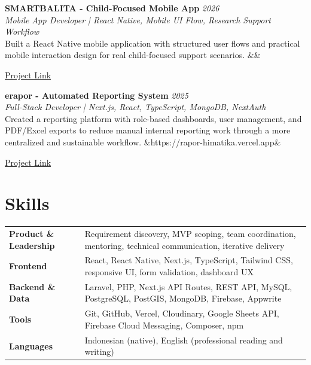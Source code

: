 \documentclass[a4paper,10pt]{article}
\newcommand{\project}[5]{%
  \textbf{#1} \hfill \textit{#2}\\
  \textit{\small #3}\\
  {\small #4}
  \ifx&#5& \else \par{\small \href{#5}{Project Link}} \fi
  \vspace{4pt}
}
\begin{document}
\project
  {SMARTBALITA - Child-Focused Mobile App}
  {2026}
  {Mobile App Developer | React Native, Mobile UI Flow, Research Support Workflow}
  {Built a React Native mobile application with structured user flows and practical mobile interaction design for real child-focused support scenarios.}
  {}

\project
  {erapor - Automated Reporting System}
  {2025}
  {Full-Stack Developer | Next.js, React, TypeScript, MongoDB, NextAuth}
  {Created a reporting platform with role-based dashboards, user management, and PDF/Excel exports to reduce manual internal reporting work through a more centralized and sustainable workflow.}
  {https://rapor-himatika.vercel.app}

\section{Skills}
\begin{tabularx}{\textwidth}{@{}l X@{}}
\textbf{Product \& Leadership} & Requirement discovery, MVP scoping, team coordination, mentoring, technical communication, iterative delivery \\[2pt]
\textbf{Frontend} & React, React Native, Next.js, TypeScript, Tailwind CSS, responsive UI, form validation, dashboard UX \\[2pt]
\textbf{Backend \& Data} & Laravel, PHP, Next.js API Routes, REST API, MySQL, PostgreSQL, PostGIS, MongoDB, Firebase, Appwrite \\[2pt]
\textbf{Tools} & Git, GitHub, Vercel, Cloudinary, Google Sheets API, Firebase Cloud Messaging, Composer, npm \\[2pt]
\textbf{Languages} & Indonesian (native), English (professional reading and writing)
\end{tabularx}
\end{document}
